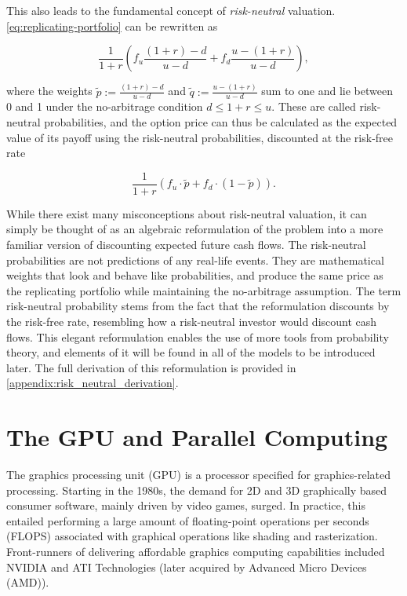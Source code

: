 \documentclass[english,12pt,a4paper,pdftex,sci,utf8]{aaltothesis}
\begin{document}
This also leads to the fundamental concept of \emph{risk-neutral} valuation. \cref{eq:replicating-portfolio} can be rewritten as

\begin{equation*}
     \frac{1}{1+r}\left(f_u\frac{(1+r)-d}{u-d}+f_d\frac{u-(1+r)}{u-d}\right),
\end{equation*}

where the weights $\tilde{p} := \frac{(1+r)-d}{u-d}$ and $\tilde{q} := \frac{u-(1+r)}{u-d}$ sum to one and lie between 0 and 1 under the no-arbitrage condition $d \leq 1+r \leq u$. These are called risk-neutral probabilities, and the option price can thus be calculated as the expected value of its payoff using the risk-neutral probabilities, discounted at the risk-free rate

\begin{equation}
     \frac{1}{1+r}(f_u\cdot \tilde p + f_d \cdot (1-\tilde p)).
\label{eq:risk-neutral-expectancy}
\end{equation}

While there exist many misconceptions about risk-neutral valuation, it can simply be thought of as an algebraic reformulation of the problem into a more familiar version of discounting expected future cash flows. The risk-neutral probabilities are not predictions of any real-life events. They are mathematical weights that look and behave like probabilities, and produce the same price as the replicating portfolio while maintaining the no-arbitrage assumption. The term risk-neutral probability stems from the fact that the reformulation discounts by the risk-free rate, resembling how a risk-neutral investor would discount cash flows. This elegant reformulation enables the use of more tools from probability theory, and elements of it will be found in all of the models to be introduced later. The full derivation of this reformulation is provided in \cref{appendix:risk_neutral_derivation}. \cite{gisiger2010risk} \cite{tham2001risk}


\section{The GPU and Parallel Computing} \label{sec:gpu}
The graphics processing unit (GPU) is a processor specified for graphics-related processing. Starting in the 1980s, the demand for 2D and 3D graphically based consumer software, mainly driven by video games, surged. In practice, this entailed performing a large amount of floating-point operations per seconds (FLOPS) associated with graphical operations like shading and rasterization. Front-runners of delivering affordable graphics computing capabilities included NVIDIA and ATI Technologies (later acquired by Advanced Micro Devices (AMD)).\cite{sanders2010cuda} \cite{kirk2016programming}
\end{document}

